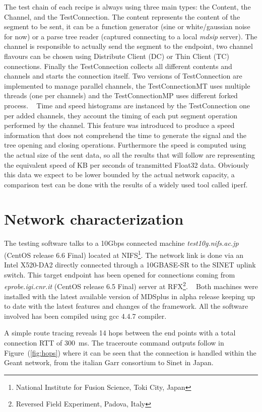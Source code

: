 \documentclass[10pt,a4paper]{article}
\begin{document}
The test chain of each recipe is always using three main types: the Content, the Channel, and the TestConnection. The content represents the content of the segment to be sent, it can be a function generator (sine or white/gaussian noise for now) or a parse tree reader (captured connecting to a local \emph{mdsip} server). The channel is responsible to actually send the segment to the endpoint, two channel flavours can be chosen using Distribute Client (DC) or Thin Client (TC) connections. Finally the TestConnection collects all different contents and channels and starts the connection itself. Two versions of TestConnection are implemented to manage parallel channels, the TestConnectionMT uses multiple threads (one per channels) and the TestConnectionMP uses different forked process.
~
Time and speed histograms are instanced by the TestConnection one per added channels, they account the timing of each put segment operation performed by the channel. This feature was introduced to produce a speed information that does not comprehend the time to generate the signal and the tree opening and closing operations. 
Furthermore the speed is computed using the actual size of the sent data, so all the results that will follow are representing the equivalent speed of KB per seconds of transmitted Float32 data. Obviously this data we expect to be lower bounded by the actual network capacity, a comparison test can be done with the results of a widely used tool called iperf.

\section{Network characterization}

The testing software talks to a 10Gbps connected machine \emph{test10g.nifs.ac.jp} (CentOS release 6.6 Final) located at NIFS\footnote{National Institute for Fusion Science, Toki City, Japan}.
The network link is done via an Intel X520-DA2 directly connected through a 10GBASE-SR to the SINET uplink switch.
This target endpoint has been opened for connections coming from \emph{eprobe.igi.cnr.it} (CentOS release 6.5 Final) server at RFX\footnote{Reversed Field Experiment, Padova, Italy}.
~
Both machines were installed with the latest available version of MDSplus in alpha release keeping up to date with the latest features and changes of the framework.
All the software involved has been compiled using gcc 4.4.7 compiler.

A simple route tracing reveals 14 hops between the end points with a total connection RTT of 300~ms. 
The traceroute command outputs follow in Figure~(\ref{fig:hops}) where it can be seen that the connection is handled within the Geant network, from the italian Garr consortium to Sinet in Japan.
\end{document}
